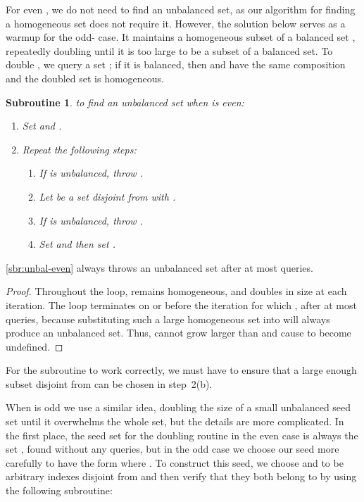 \documentclass[11pt]{llncs}
\newtheorem{subroutine}{Subroutine}
\begin{document}
For even , we do not need to find an unbalanced set, as our algorithm for finding a homogeneous set does not require it. However, the solution below serves as a warmup for the odd- case. It maintains a homogeneous subset  of a balanced set , repeatedly doubling  until it is too large to be a subset of a balanced set. To double , we query a set ; if it is balanced, then  and  have the same composition and the doubled set  is homogeneous.
\ifFull
\newpage
\fi
\begin{subroutine}
\label{sbr:unbal-even}
to find an unbalanced set when  is even:
\begin{enumerate}
\item Set  and .
\item Repeat the following steps:
\begin{enumerate}
\item If  is unbalanced, throw .
\item Let  be a set disjoint from  with .
\item If  is unbalanced, throw .
\item Set  and then set .
\end{enumerate}
\end{enumerate}
\end{subroutine}

\ifFull
\begin{lemma}
\autoref{sbr:unbal-even} always throws an unbalanced set after at most  queries.
\end{lemma}

\begin{proof}
\fi
Throughout the loop,  remains homogeneous, and doubles in size at each iteration. The loop terminates on or before the iteration for which ,  after at most  queries,
because substituting such a large homogeneous set into  will always produce an unbalanced set. Thus,  cannot grow larger than  and cause  to become undefined.
\ifFull
\end{proof}
\fi
For the subroutine to work correctly, we must have  to ensure that  a large enough subset  disjoint from  can be chosen in step~2(b).

When  is odd we use a similar idea, doubling the size of a small unbalanced seed set until it overwhelms the whole set, but the details are more complicated. In the first place, the seed set for the doubling routine in the even case is always the set , found without any queries, but in the odd case we choose our seed more carefully to have the form  where .
To construct this seed, we choose  and  to be arbitrary indexes disjoint from  and then verify that they both belong to  by using the following subroutine:
\end{document}
